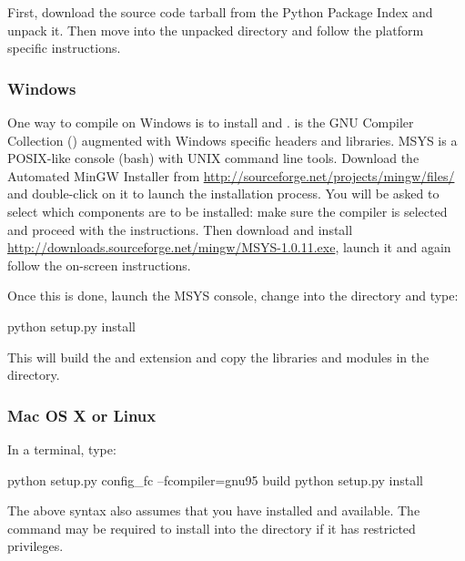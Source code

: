 \documentclass[]{jss}
\begin{document}
First, download the source code tarball from the Python Package Index and unpack it. Then move
into the unpacked directory and follow the platform specific instructions.



\subsubsection{Windows}
  \label{windows}%


One way to compile  on Windows is to install  \citep{mingw} and  \citep{msys}.  is
the GNU Compiler Collection () augmented with Windows specific headers and
libraries. MSYS is a POSIX-like console (bash) with UNIX command line tools.
Download the Automated MinGW Installer from \href{http://sourceforge.net/projects/mingw/files/}{http://sourceforge.net/projects/mingw/files/} and double-click on it to launch
the installation process. You will be asked to select which
components are to be installed: make sure the  \citep{gcc} compiler is selected and
proceed with the instructions. Then download and install \href{http://downloads.sourceforge.net/mingw/MSYS-1.0.11.exe}{http://downloads.sourceforge.net/mingw/MSYS-1.0.11.exe},
launch it and again follow the on-screen instructions.

Once this is done, launch the MSYS console, change into the  directory and
type:
\begin{CodeInput}
python setup.py install
\end{CodeInput}

This will build the  and  extension and copy the libraries and  
modules in the  directory.



\subsubsection{Mac OS X or Linux}
  \label{mac-os-x-or-linux}%


In a terminal, type:
\begin{CodeInput}
python setup.py config_fc --fcompiler=gnu95 build
python setup.py install
\end{CodeInput}

The above syntax also assumes that you have  installed and available. The
 command may be required to install  into the  
directory if it has restricted privileges.
\end{document}
